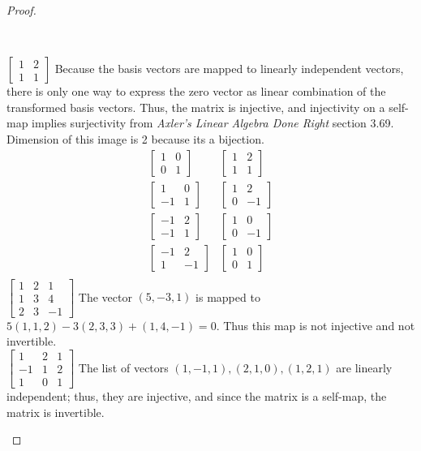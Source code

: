 \documentclass[11pt]{article}
\newenvironment{myproof}
{\begin{proof} \begin{adjustwidth}{3em}{0pt}$ $\par\nobreak\ignorespaces}
{\end{adjustwidth} \end{proof}}
\begin{document}
\begin{flushleft}
\begin{myproof}
$\begin{bmatrix}
1 & 2 \\
1 & 1 
\end{bmatrix}$ Because the basis vectors are mapped to linearly independent vectors, there is only one way to express the zero vector as linear combination of the transformed basis vectors. Thus, the matrix is injective, and injectivity on a self-map implies surjectivity from \textit{Axler's Linear Algebra Done Right} section 3.69. Dimension of this image is 2 because its a bijection.
\begin{align*}
\begin{bmatrix}
1 & 0 \\
0 & 1
\end{bmatrix}
&\begin{bmatrix}
1 & 2 \\
1 & 1 
\end{bmatrix} \\
\begin{bmatrix}
1 & 0 \\
-1 & 1
\end{bmatrix}
&\begin{bmatrix}
1 & 2 \\
0 & -1 
\end{bmatrix} \\
\begin{bmatrix}
-1 & 2 \\
-1 & 1
\end{bmatrix}
&\begin{bmatrix}
1 & 0 \\
0 & -1 
\end{bmatrix} \\
\begin{bmatrix}
-1 & 2 \\
1 & -1
\end{bmatrix}
&\begin{bmatrix}
1 & 0 \\
0 & 1 
\end{bmatrix} \\
\end{align*}
\bigskip
$\begin{bmatrix}
1 & 2 & 1 \\
1 & 3 & 4 \\
2 & 3 & -1
\end{bmatrix}$
The vector $(5,-3,1)$ is mapped to $5(1,1,2) -3(2,3,3) +(1,4,-1) = 0 $. Thus this map is not injective and not invertible. \\
\bigskip
$ \begin{bmatrix}
1 & 2 & 1 \\
-1 & 1 & 2 \\
1 & 0 & 1
\end{bmatrix}$
The list of vectors $(1,-1,1),(2,1,0),(1,2,1)$ are linearly independent; thus, they are injective, and since the matrix is a self-map, the matrix is invertible.


\end{myproof}
\end{flushleft}
\end{document}
